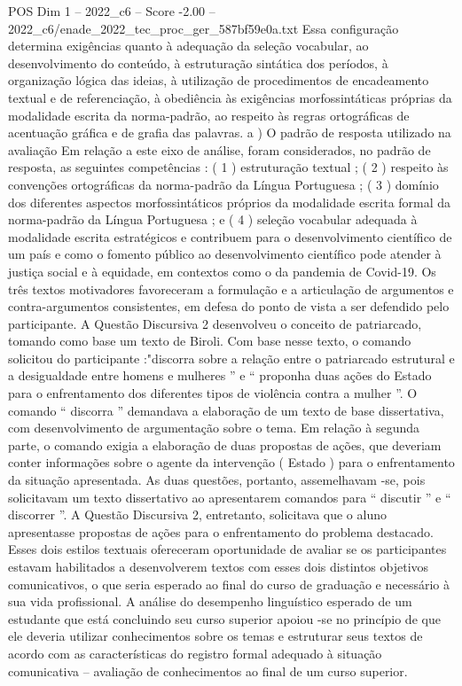 \begin{textsample}{POS Dim 1 – 2022\_c6 – Score -2.00 – 2022\_c6/enade\_2022\_tec\_proc\_ger\_587bf59e0a.txt}
Essa configuração determina exigências quanto à adequação da seleção vocabular, ao desenvolvimento do conteúdo, à estruturação sintática dos períodos, à organização lógica das ideias, à utilização de procedimentos de encadeamento textual e de referenciação, à obediência às exigências morfossintáticas próprias da modalidade escrita da norma-padrão, ao respeito às regras ortográficas de acentuação gráfica e de grafia das palavras. a ) O padrão de resposta utilizado na avaliação Em relação a este eixo de análise, foram considerados, no padrão de resposta, as seguintes competências : ( 1 ) estruturação textual ; ( 2 ) respeito às convenções ortográficas da norma-padrão da Língua Portuguesa ; ( 3 ) domínio dos diferentes aspectos morfossintáticos próprios da modalidade escrita formal da norma-padrão da Língua Portuguesa ; e ( 4 ) seleção vocabular adequada à modalidade escrita estratégicos e contribuem para o desenvolvimento científico de um país e como o fomento público ao desenvolvimento científico pode atender à justiça social e à equidade, em contextos como o da pandemia de Covid-19.
Os três textos motivadores favoreceram a formulação e a articulação de argumentos e contra-argumentos consistentes, em defesa do ponto de vista a ser defendido pelo participante.
A Questão Discursiva 2 desenvolveu o conceito de patriarcado, tomando como base um texto de Biroli.
Com base nesse texto, o comando solicitou do participante :"discorra sobre a relação entre o patriarcado estrutural e a desigualdade entre homens e mulheres ” e “ proponha duas ações do Estado para o enfrentamento dos diferentes tipos de violência contra a mulher ”.
O comando “ discorra ” demandava a elaboração de um texto de base dissertativa, com desenvolvimento de argumentação sobre o tema.
Em relação à segunda parte, o comando exigia a elaboração de duas propostas de ações, que deveriam conter informações sobre o agente da intervenção ( Estado ) para o enfrentamento da situação apresentada.
As duas questões, portanto, assemelhavam -se, pois solicitavam um texto dissertativo ao apresentarem comandos para “ discutir ” e “ discorrer ”.
A Questão Discursiva 2, entretanto, solicitava que o aluno apresentasse propostas de ações para o enfrentamento do problema destacado.
Esses dois estilos textuais ofereceram oportunidade de avaliar se os participantes estavam habilitados a desenvolverem textos com esses dois distintos objetivos comunicativos, o que seria esperado ao final do curso de graduação e necessário à sua vida profissional.
A análise do desempenho linguístico esperado de um estudante que está concluindo seu curso superior apoiou -se no princípio de que ele deveria utilizar conhecimentos sobre os temas e estruturar seus textos de acordo com as características do registro formal adequado à situação comunicativa – avaliação de conhecimentos ao final de um curso superior.

\end{textsample}
